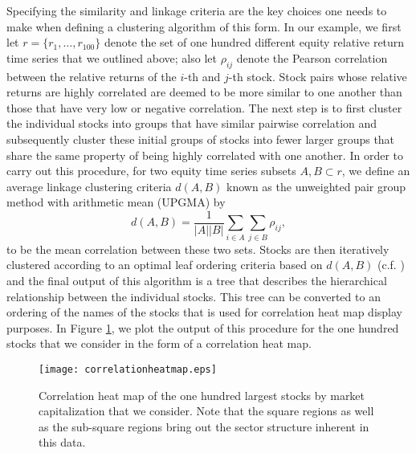 \documentclass{amsart}
\begin{document}
Specifying the similarity and linkage criteria are the key choices one needs to make when defining
a clustering algorithm of this form.  In our example, we first let $
r = \{r_1,\ldots, r_{100}\}$ denote the set of one hundred different equity relative return time 
series that we outlined above; also let $\rho_{ij}$ denote the Pearson correlation between the relative returns 
of the $i$-th and $j$-th stock. 
Stock pairs whose relative returns are highly correlated are deemed to 
be more similar to one another than those that have very low or negative correlation.  
The next step is to first cluster the individual stocks into groups that have similar 
pairwise correlation 
and subsequently cluster these initial groups of stocks into fewer larger groups that 
share the same property of being highly correlated with one another.  
In order to carry out this procedure,
for two equity time series subsets $A,B\subset r$, 
we define an average linkage clustering criteria $d(A,B)$ known as the 
unweighted pair group method with arithmetic mean (UPGMA) by 
%
\begin{equation}
    d(A,B) = \frac{1}{|A||B|} \sum_{i\in A}\sum_{j\in B} \rho_{ij},
\end{equation}
%
to be the mean correlation between these two sets. Stocks are then iteratively clustered 
according to an optimal leaf ordering criteria based on $d(A,B)$ (c.f. \cite{Bar-Joseph-01})
and the final output of this algorithm is a tree that describes the hierarchical relationship 
between the individual stocks.  This tree can be converted to an ordering of the names of the 
stocks that is used for correlation heat map display purposes.   In Figure  
\ref{corrheatmap1}, we plot the output of this procedure for the one hundred stocks that we 
consider in the form of a correlation heat map. 

\begin{figure}[h!]
    \centering
    \texttt{[image: correlationheatmap.eps]}
    \caption{Correlation heat map of the one hundred largest stocks by market 
     capitalization that we consider.  Note that 
    the square regions as well as the sub-square regions bring out the sector structure inherent 
    in this data.}
    \label{corrheatmap1}
\end{figure}
\end{document}
